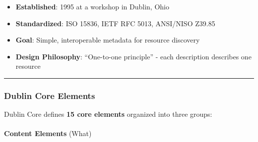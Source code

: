 \documentclass[
  letterpaper,
  DIV=11,
  numbers=noendperiod]{scrartcl}
\makeatletter
\let\oldparagraph\paragraph
\renewcommand{\paragraph}{
    \@ifstar
      \xxxParagraphStar
      \xxxParagraphNoStar
  }
\newcommand{\xxxParagraphStar}[1]{\oldparagraph*{#1}\mbox{}}
\newcommand{\xxxParagraphNoStar}[1]{\oldparagraph{#1}\mbox{}}
\providecommand{\tightlist}{%
  \setlength{\itemsep}{0pt}\setlength{\parskip}{0pt}}\usepackage{longtable,booktabs,array}
\makeatother
\begin{document}
\begin{itemize}
\tightlist
\item
  \textbf{Established}: 1995 at a workshop in Dublin, Ohio
\item
  \textbf{Standardized}: ISO 15836, IETF RFC 5013, ANSI/NISO Z39.85
\item
  \textbf{Goal}: Simple, interoperable metadata for resource discovery
\item
  \textbf{Design Philosophy}: ``One-to-one principle'' - each
  description describes one resource
\end{itemize}

\begin{center}\rule{0.5\linewidth}{0.5pt}\end{center}

\subsubsection{Dublin Core Elements}\label{dublin-core-elements}

Dublin Core defines \textbf{15 core elements} organized into three
groups:

\paragraph{\texorpdfstring{\textbf{Content Elements}
(What)}{Content Elements (What)}}\label{content-elements-what}
\end{document}

